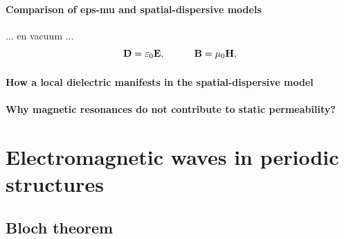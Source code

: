 \paragraph{Comparison of eps-mu and spatial-dispersive models}%
... en vacuum ...
\begin{equation}		\mathbf{D} = \varepsilon_0	\mathbf{E}, \quad\quad\quad						\mathbf{B} = \mu_0			\mathbf{H},				 \label{eq_ce_dispersive}\end{equation}
\paragraph{How a local dielectric manifests in the spatial-dispersive model}  %
\paragraph{Why magnetic resonances do not contribute to static permeability?}%

\section{Electromagnetic waves in periodic structures}
\subsection{Bloch theorem}
